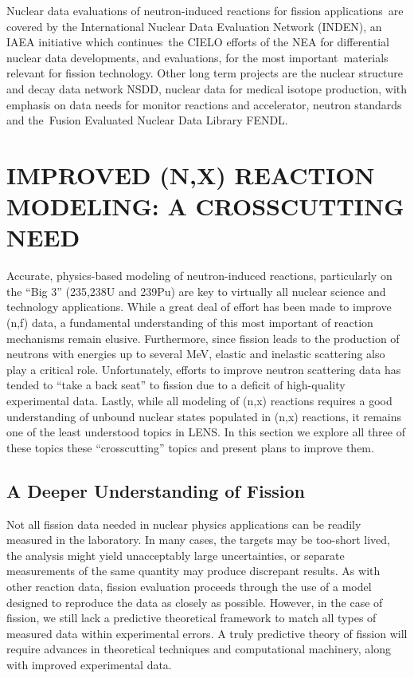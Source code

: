 \documentclass[letterpaper]{ar-1col}
\begin{document}
Nuclear data evaluations of neutron-induced reactions for fission applications are covered by the International Nuclear Data Evaluation Network (INDEN), an IAEA initiative which continues the CIELO efforts of the NEA for differential nuclear data developments, and evaluations, for the most important materials relevant for fission technology.  Other long term projects are the nuclear structure and decay data network NSDD, nuclear data for medical isotope production, with emphasis on data needs for monitor reactions and accelerator, neutron standards and the Fusion Evaluated Nuclear Data Library FENDL.

\section{IMPROVED (N,X) REACTION MODELING: A CROSSCUTTING NEED}

Accurate, physics-based modeling of neutron-induced reactions, particularly on the “Big 3” (235,238U and 239Pu) are key to virtually all nuclear science and technology applications.  While a great deal of effort has been made to improve (n,f) data, a fundamental understanding of this most important of reaction mechanisms remain elusive.  Furthermore, since fission leads to the production of neutrons with energies up to several MeV, elastic and inelastic scattering also play a critical role.  Unfortunately, efforts to improve neutron scattering data has tended to “take a back seat” to fission due to a deficit of high-quality experimental data.  Lastly, while all modeling of (n,x) reactions requires a good understanding of unbound nuclear states populated in (n,x) reactions, it remains one of the least understood topics in LENS.  In this section we explore all three of these topics these “crosscutting” topics and present plans to improve them.  

\subsection{A Deeper Understanding of Fission}

Not all fission data needed in nuclear physics applications can be readily measured in the laboratory. In many cases, the targets may be too-short lived, the analysis might yield unacceptably large uncertainties, or separate measurements of the same quantity may produce discrepant results. As with other reaction data, fission evaluation proceeds through the use of a model designed to reproduce the data as closely as possible.  However, in the case of fission, we still lack a predictive theoretical framework to match all types of measured data within experimental errors. A truly predictive theory of fission will require advances in theoretical techniques and computational machinery, along with improved experimental data.
\end{document}
